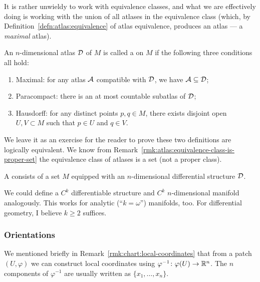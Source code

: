 \begin{remark}
It is rather unwieldy to work with equivalence classes, and what we are
effectively doing is working with the union of all atlases in the
equivalence class (which, by Definition~\ref{defn:atlas:equivalence}
of atlas equivalence, produces an atlas --- a \emph{maximal} atlas).
\end{remark}

\begin{definition}
An $n$-dimensional atlas $\mathcal{D}$ of $M$ is called a 
on $M$ if the following three conditions all hold:
\begin{enumerate}
\item Maximal: for any atlas $\mathcal{A}$ compatible with $\mathcal{D}$, we
  have $\mathcal{A}\subseteq\mathcal{D}$;
\item Paracompact: there is an at most countable subatlas of $\mathcal{D}$;
\item Hausdorff: for any distinct points $p,q\in M$, there exists
  disjoint open $U,V\subset M$ such that $p\in U$ and $q\in V$.
\end{enumerate}
\end{definition}

\begin{remark}
We leave it as an exercise for the reader to prove these two definitions
are logically equivalent. We know from Remark~\ref{rmk:atlas:equivalence-class-is-proper-set}
the equivalence class of atlases is a set (not a proper class).
\end{remark}

\begin{definition}
A  consists of
  a set $M$ equipped with an $n$-dimensional differential structure $\mathcal{D}$.
\end{definition}

\begin{remark}
We could define a $C^{k}$ differentiable structure and $C^{k}$
$n$-dimensional manifold analogously. This works for analytic
(``$k=\omega$'') manifolds, too. For differential geometry, I believe
$k\geq2$ suffices.
\end{remark}

\subsubsection{Orientations}

We mentioned briefly in Remark~\ref{rmk:chart:local-coordinates}
that from a patch $(U,\varphi)$ we can construct local coordinates using
$\varphi^{-1}\colon\varphi(U)\to\mathbb{R}^{n}$.
The $n$ components of $\varphi^{-1}$ are usually written as
$\{x_{1},\dots,x_{n}\}$.

